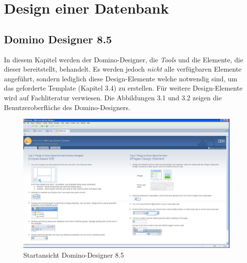 \chapter{Design einer Datenbank}



\section{Domino Designer 8.5}
\label{sec:4designelemente}

In diesem Kapitel werden der Domino-Designer, die \textit{Tools} und die Elemente, die dieser bereitstellt, behandelt. Es werden
jedoch \textit{nicht} alle verfügbaren Elemente angeführt, sondern lediglich diese Design-Elemente  
welche notwendig sind, um das geforderte Template (Kapitel 3.4) zu erstellen. 
Für weitere Design-Elemente wird auf Fachliteratur verwiesen.\newline
\newline
Die Abbildungen 3.1 und 3.2 zeigen die Benutzeroberfläche des Domino-Designers.  
\begin{figure}[H]
    \centerline{\includegraphics[scale=0.35]{pics/startansicht_designer}}
    \caption[Domino-Designer]{\label{FiG:Domino-Designer}
	Startansicht Domino-Designer 8.5}
\end{figure}

